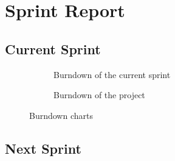 \section{Sprint Report}

\subsection{Current Sprint}

\begin{figure}[!ht]
    \centering
    \begin{subfigure}[b]{0.5\textwidth}
        \scalebox{.6}{}
        \caption{Burndown of the current sprint}
        \label{fig:burndownSprint}
    \end{subfigure}%
    \begin{subfigure}[b]{0.5\textwidth}
        \scalebox{.7}{}
        \caption{Burndown of the project}
        \label{fig:burndownProject}
    \end{subfigure}
    \caption{Burndown charts}
    \label{fig:burndown}
\end{figure}

\subsection{Next Sprint}


